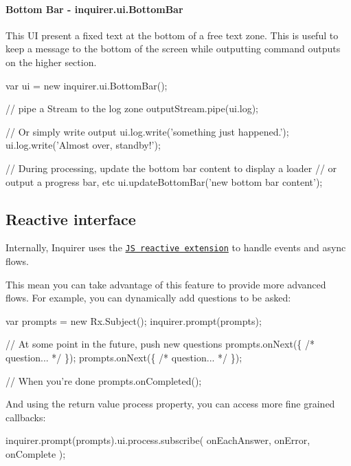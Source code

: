 \paragraph*{Bottom Bar -\/ {\ttfamily inquirer.\+ui.\+Bottom\+Bar}}

This UI present a fixed text at the bottom of a free text zone. This is useful to keep a message to the bottom of the screen while outputting command outputs on the higher section.


\begin{DoxyCode}
var ui = new inquirer.ui.BottomBar();

// pipe a Stream to the log zone
outputStream.pipe(ui.log);

// Or simply write output
ui.log.write('something just happened.');
ui.log.write('Almost over, standby!');

// During processing, update the bottom bar content to display a loader
// or output a progress bar, etc
ui.updateBottomBar('new bottom bar content');
\end{DoxyCode}


\label{_reactive}%
 \subsection*{Reactive interface}

Internally, Inquirer uses the \href{https://github.com/Reactive-Extensions/RxJS}{\tt JS reactive extension} to handle events and async flows.

This mean you can take advantage of this feature to provide more advanced flows. For example, you can dynamically add questions to be asked\+:


\begin{DoxyCode}
var prompts = new Rx.Subject();
inquirer.prompt(prompts);

// At some point in the future, push new questions
prompts.onNext(\{ /* question... */ \});
prompts.onNext(\{ /* question... */ \});

// When you're done
prompts.onCompleted();
\end{DoxyCode}


And using the return value {\ttfamily process} property, you can access more fine grained callbacks\+:


\begin{DoxyCode}
inquirer.prompt(prompts).ui.process.subscribe(
  onEachAnswer,
  onError,
  onComplete
);
\end{DoxyCode}


